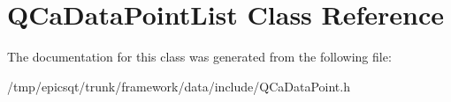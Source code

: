 \hypertarget{classQCaDataPointList}{
\section{QCaDataPointList Class Reference}
\label{classQCaDataPointList}
}


The documentation for this class was generated from the following file:\begin{DoxyCompactItemize}
\item 
/tmp/epicsqt/trunk/framework/data/include/QCaDataPoint.h\end{DoxyCompactItemize}
